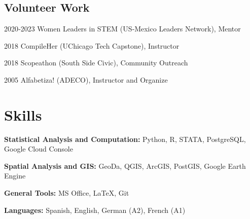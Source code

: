 \documentclass[12pt,letterpaper]{report}
\begin{document}
    \subsection*{Volunteer Work}
    \begin{tablist}
    \item[2020‑2023] \tab{}Women Leaders in STEM (US‑Mexico Leaders Network), Mentor
    \item[2018] \tab{}CompileHer (UChicago Tech Capstone), Instructor
    \item[2018] \tab{}Scopeathon (South Side Civic), Community Outreach
    \item[2005] \tab{}Alfabetiza! (ADECO), Instructor and Organize
    \end{tablist}
    
    \section*{Skills}
    \begin{tablist}
        \item[\textbf{Statistical Analysis and Computation:}] Python, R, STATA, PostgreSQL, Google Cloud Console
        \item[\textbf{Spatial Analysis and GIS:}] GeoDa, QGIS, ArcGIS, PostGIS, Google Earth Engine
        \item[\textbf{General Tools:}] MS Office, LaTeX, Git
        \item[\textbf{Languages:}] Spanish, English, German (A2), French (A1)
    \end{tablist}
\end{document}
